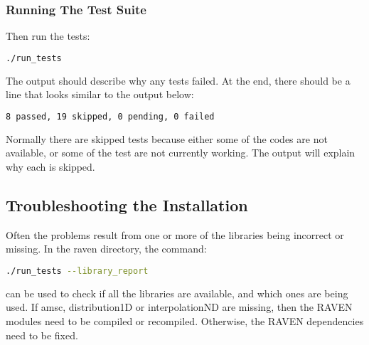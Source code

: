 \subsubsection{Running The Test Suite}
Then run the tests:

\begin{lstlisting}[language=bash]
./run_tests
\end{lstlisting}

The output should describe why any tests failed.
%
At the end, there should be a line that looks similar to the output below:
\begin{lstlisting}[language=bash]
8 passed, 19 skipped, 0 pending, 0 failed
\end{lstlisting}

Normally there are skipped tests because either some of the codes are
not available, or some of the test are not currently working.  The
output will explain why each is skipped.

\subsection{Troubleshooting the Installation}

Often the problems result from one or more of the libraries being
incorrect or missing.  In the raven directory, the command:

\begin{lstlisting}[language=bash]
./run_tests --library_report
\end{lstlisting}
can be used to check if all the libraries are available, and which
ones are being used.  If amsc, distribution1D or interpolationND are
missing, then the RAVEN modules need to be compiled or recompiled.
Otherwise, the RAVEN dependencies need to be fixed.
